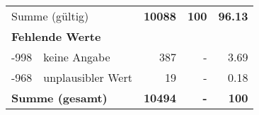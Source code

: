 \begin{longtable}{lXrrr}
     \midrule
     \multicolumn{2}{l}{Summe (gültig)} &
       \textbf{\num{10088}} &
     \textbf{\num{100}} &
       \textbf{\num[round-mode=places,round-precision=2]{96.13}} \\
     \multicolumn{5}{l}{\textbf{Fehlende Werte}}\\
       -998 &
       keine Angabe &
         \num{387} &
        - &
         \num[round-mode=places,round-precision=2]{3.69} \\
       -968 &
       unplausibler Wert &
         \num{19} &
        - &
         \num[round-mode=places,round-precision=2]{0.18} \\
     \midrule
     \multicolumn{2}{l}{\textbf{Summe (gesamt)}} &
          \textbf{\num{10494}} &
        \textbf{-} &
        \textbf{\num{100}} \\
     \bottomrule
     \end{longtable}
     
